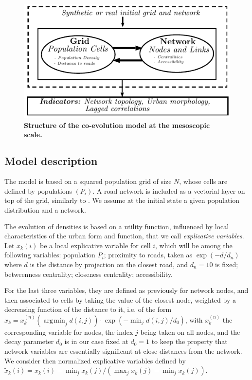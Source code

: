 \documentclass[11pt]{article}
\DeclareMathOperator*{\argmin}{\arg\!\min}
\begin{document}
\begin{figure}
	\includegraphics[width=\linewidth]{mesocoevol.pdf}
	\caption{\textbf{Structure of the co-evolution model at the mesoscopic scale.}\label{fig:mesocoevolmodel:workflow}}
\end{figure}

\subsection{Model description}


The model is based on a squared population grid of size $N$, whose cells are defined by populations $(P_i)$. A road network is included as a vectorial layer on top of the grid, similarly to \cite{raimbault2014hybrid}. We assume at the initial state a given population distribution and a network.

The evolution of densities is based on a utility function, influenced by local characteristics of the urban form and function, that we call \emph{explicative variables}. Let $x_k(i)$ be a local explicative variable for cell $i$, which will be among the following variables: population $P_i$; proximity to roads, taken as $\exp (-d / d_n)$ where $d$ is the distance by projection on the closest road, and $d_n=10$ is fixed; betweenness centrality; closeness centrality; accessibility.

For the last three variables, they are defined as previously for network nodes, and then associated to cells by taking the value of the closest node, weighted by a decreasing function of the distance to it, i.e. of the form $x_k = x^{(n)}_k (\argmin_j d(i,j)) \cdot \exp \left( -  \min_j d(i,j) / d_0 \right)$, with $x^{(n)}_k$ the corresponding variable for nodes, the index $j$ being taken on all nodes, and the decay parameter $d_0$ is in our case fixed at $d_0=1$ to keep the property that network variables are essentially significant at close distances from the network. We consider then normalized explicative variables defined by $\tilde{x}_k(i) = x_k(i) - \min_j x_k(j) / (\max_j x_k(j) - \min_j x_k(j))$.
\end{document}
